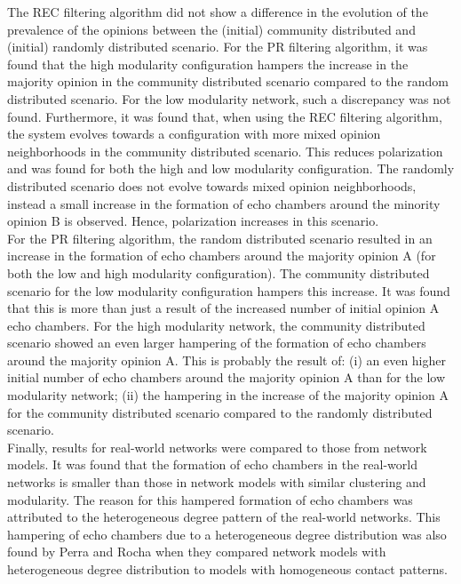 \documentclass[11 pt , letterpaper , twoside , openright]{book}
\begin{document}
The REC filtering algorithm did not show a difference in the evolution of the prevalence of the opinions between the (initial) community distributed and (initial) randomly distributed scenario. For the PR filtering algorithm, it was found that the high modularity configuration hampers the increase in the majority opinion in the community distributed scenario compared to the random distributed scenario. For the low modularity network, such a discrepancy was not found. Furthermore, it was found that, when using the REC filtering algorithm, the system evolves towards a configuration with more mixed opinion neighborhoods in the community distributed scenario. This reduces polarization and was found for both the high and low modularity configuration. The randomly distributed scenario does not evolve towards mixed opinion neighborhoods, instead a small increase in the formation of echo chambers around the minority opinion B is observed. Hence, polarization increases in this scenario.\\
\newline
For the PR filtering algorithm, the random distributed scenario resulted in an increase in the formation of echo chambers around the majority opinion A (for both the low and high modularity configuration). The community distributed scenario for the low modularity configuration hampers this increase. It was found that this is more than just a result of the increased number of initial opinion A echo chambers. For the high modularity network, the community distributed scenario showed an even larger hampering of the formation of echo chambers around the majority opinion A. This is probably the result of: (i) an even higher initial number of echo chambers around the majority opinion A than for the low modularity network; (ii) the hampering in the increase of the majority opinion A for the community distributed scenario compared to the randomly distributed scenario. \\
\newline
Finally, results for real-world networks were compared to those from network models. It was found that the formation of echo chambers in the real-world networks is smaller than those in network models with similar clustering and modularity. The reason for this hampered formation of echo chambers was attributed to the heterogeneous degree pattern of the real-world networks. This hampering of echo chambers due to a heterogeneous degree distribution was also found by Perra and Rocha \cite{Perra2019} when they compared network models with heterogeneous degree distribution to models with homogeneous contact patterns.\\
\end{document}
